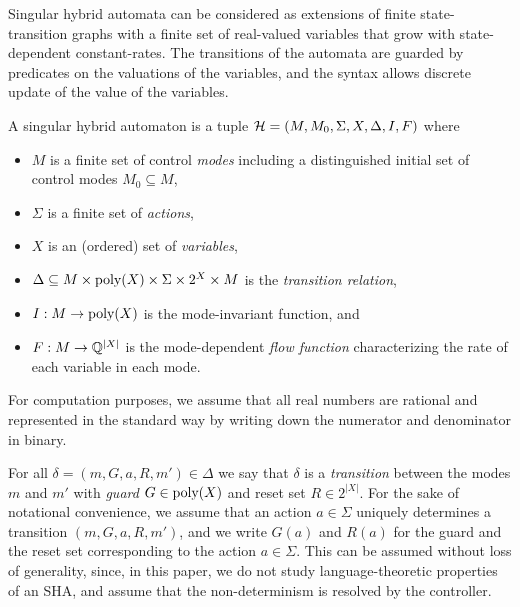 Singular hybrid automata can be considered as extensions of finite
state-transition graphs with a finite set of real-valued variables that grow
with state-dependent constant-rates. 
The transitions of the automata are guarded by predicates on the valuations of
the variables, and the syntax allows discrete update of the value of the
variables. 
%
 \begin{definition}
   A singular hybrid automaton is a tuple 
   $\mathcal{H} = (M, M_0, \Sigma, X, \Delta, I, F)$ where 
  \begin{itemize}
  \item 
    $M$ is a finite set of control \emph{modes} including a distinguished
    initial set of control modes $M_0 \subseteq M$, 
  \item 
    $\Sigma$ is a finite set of \emph{actions},
  \item 
    $X$ is an (ordered) set of \emph{variables}, 
  \item
    $\Delta \subseteq M \times \textrm{poly}(X) \times \Sigma \times 2^{X}
    \times M$ is the \emph{transition relation}, 
  \item 
    $I: M \to \textrm{poly}(X)$  is the mode-invariant function, and
    \item 
    $F: M \to \mathbb Q^{|X|}$ is the mode-dependent \emph{flow function}
    characterizing the rate of each variable in each mode.
  \end{itemize}
For computation purposes, we assume that all real numbers are rational and
represented in the standard way by writing down the numerator and denominator
in binary.
\end{definition}

For all $\delta = (m, G, a, R, m') \in \Delta$ we say that $\delta$ is a
\emph{transition} between the modes $m$ and $m'$ with \emph{guard} $G \in
\textrm{poly}(X)$ and reset set $R \in 2^{|X|}$. 
For the sake of notational convenience, we assume that an action
$a \in \Sigma$ uniquely determines a transition $(m, G, a, R, m')$, and we write
$G(a)$ and $R(a)$ for the guard and the reset set corresponding to the action $a
\in \Sigma$.
This can be assumed without loss of generality, since, in this paper, we do not
study language-theoretic properties of an SHA, and assume that the
non-determinism is resolved by the controller. 

